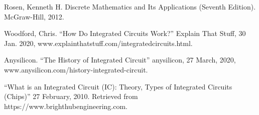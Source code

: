 \documentclass[letterpaper, 10 pt, conference]{IEEEconf}
\begin{document}
\begin{enumerate}[label={[\arabic*]}]
\item Rosen, Kenneth  H. Discrete Mathematics and Its Applications (Seventh Edition). McGraw-Hill, 2012. 
\item Woodford, Chris. “How Do Integrated Circuits Work?” Explain That Stuff, 30 Jan. 2020, www.explainthatstuff.com/integratedcircuits.html. 
\item Anysilicon. “The History of Integrated Circuit” anysilicon, 27 March, 2020, www.anysilicon.com/history-integrated-circuit.
\item “What is an Integrated Circuit (IC): Theory, Types of Integrated Circuits (Chips)” 27 February, 2010. Retrieved from https://www.brighthubengineering.com.


\end{enumerate}
\end{document}
